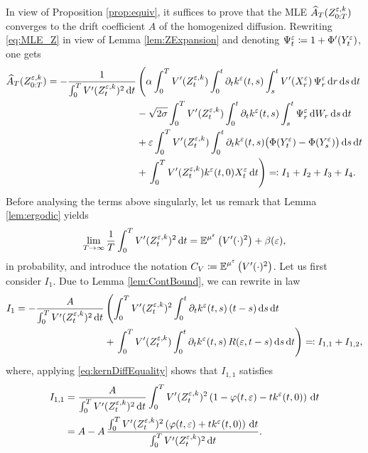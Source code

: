 \documentclass[10pt]{article}
\begin{document}
In view of Proposition \ref{prop:equiv}, it suffices to prove that the MLE $\widehat A_T (Z^{\varepsilon,k}_{0:T})$ converges to the drift coefficient $A$ of the homogenized diffusion. Rewriting \eqref{eq:MLE_Z} in view of Lemma \ref{lem:ZExpansion} and denoting $\Psi^\varepsilon_t \coloneqq 1 + \Phi'(Y_t^\varepsilon)$, one gets
\begin{equation}
\begin{aligned}
	 \widehat A_T (Z^{\varepsilon,k}_{0:T}) = -\frac{1}{\int_0^T V'(Z^{\varepsilon,k}_t)^2 \,\mathrm{d} t} &\left(\alpha \int_0^T V'(Z^{\varepsilon,k}_t) \int_0^t \partial_t k^\varepsilon(t, s) \int_s^t  V'(X^\varepsilon_r)\, \Psi^\varepsilon_r\,\mathrm{d} r \,\mathrm{d} s \,\mathrm{d} t\right.\\
	 &-\sqrt{2\sigma} \int_0^T V'(Z^{\varepsilon,k}_t) \int_0^t \partial_t k^\varepsilon(t, s)  \int_s^t \Psi^\varepsilon_r \,\mathrm{d} W_r \,\mathrm{d} s \,\mathrm{d} t\\
	 &+\varepsilon \int_0^T V'(Z^{\varepsilon,k}_t) \int_0^t \partial_t k^\varepsilon(t, s) \big(\Phi(Y^\varepsilon_t)- \Phi(Y^\varepsilon_s)\big) \,\mathrm{d} s \,\mathrm{d} t\\
	 &+ \left. \int_0^T V'(Z^{\varepsilon,k}_t) k^\varepsilon(t, 0) X^\varepsilon_t \,\mathrm{d} t \right) \eqqcolon I_1 + I_2 + I_3 + I_4.
\end{aligned}
\end{equation}
Before analysing the terms above singularly, let us remark that Lemma \ref{lem:ergodic} yields
\begin{equation}
	 \lim_{T\to\infty} \frac1T \int_0^T V'(Z^{\varepsilon,k}_t)^2 \,\mathrm{d} t = \operatorname{\mathbb{E}}^{\mu^\varepsilon} \left(V'(\cdot)^2\right) + \beta(\varepsilon),
\end{equation}
in probability, and introduce the notation $ C_V \coloneqq \operatorname{\mathbb{E}}^{\mu^\varepsilon} \left(V'(\cdot)^2\right)$.
Let us first consider $I_1$. Due to Lemma \ref{lem:ContBound}, we can rewrite in law
\begin{equation}
\begin{aligned}
	I_1 = -\frac{A}{\int_0^T V'(Z^{\varepsilon,k}_t)^2 \,\mathrm{d} t} &\left(\int_0^T V'(Z^{\varepsilon,k}_t)^2 \int_0^t \partial_t k^\varepsilon(t, s) \, (t - s) \,\mathrm{d} s \,\mathrm{d} t \right. \\
	&+ \left. \int_0^T V'(Z^{\varepsilon,k}_t) \int_0^t \partial_t k^\varepsilon(t, s) \, R(\varepsilon, t-s) \,\mathrm{d} s \,\mathrm{d} t \right) \eqqcolon I_{1,1} + I_{1,2},
\end{aligned}
\end{equation}
where, applying \eqref{eq:kernDiffEquality} shows that $I_{1,1}$ satisfies
\begin{equation}
\begin{aligned}
	I_{1,1} &= \frac{A}{\int_0^T V'(Z^{\varepsilon,k}_t)^2 \,\mathrm{d} t} \int_0^T V'(Z^{\varepsilon,k}_t)^2 \left(1 - \varphi(t, \varepsilon) - t k^\varepsilon(t, 0) \right) \,\mathrm{d} t\\
	&= A - A \, \frac{\int_0^T V'(Z^{\varepsilon,k}_t)^2 \left(\varphi(t, \varepsilon) + t k^\varepsilon(t, 0) \right) \,\mathrm{d} t}{\int_0^T V'(Z^{\varepsilon,k}_t)^2 \,\mathrm{d} t}.
\end{aligned}
\end{equation}
\end{document}
